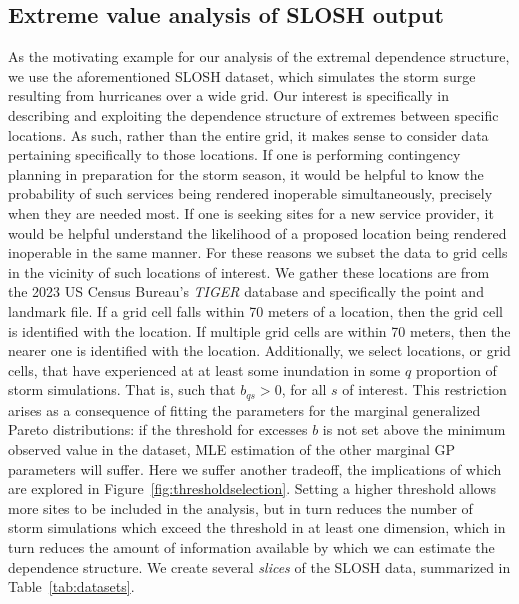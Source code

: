 \subsection{Extreme value analysis of SLOSH output\label{sec:slosh}}
As the motivating example for our analysis of the extremal dependence structure, we 
    use the aforementioned SLOSH dataset, which simulates the storm surge resulting 
    from hurricanes over a wide grid.  Our interest is specifically in describing 
    and exploiting the dependence structure of extremes between specific locations.  
    As such, rather than the entire grid, it makes sense to consider data pertaining
    specifically to those locations. If one is performing contingency planning in 
    preparation for the storm season, it would be helpful to know the probability of 
    such services being rendered 
    inoperable simultaneously, precisely when they are needed most.  If one is 
    seeking sites for a new service provider, it would be helpful understand the 
    likelihood of a proposed location being rendered inoperable in the same 
    manner.  For these reasons we subset the data to grid cells in the 
    vicinity of such locations of interest.  We gather these locations are from 
    the 2023 US Census Bureau's \emph{TIGER} database \needcite and specifically 
    the point and landmark file.  If a grid cell falls within 70 meters of a location,
    then the grid cell is identified with the location.  If multiple grid cells
    are within 70 meters, then the nearer one is identified with the location.
    Additionally, we select locations, or grid cells, that have experienced at
    at least some inundation in some $q$ proportion of storm simulations.  That is,
    such that $b_{qs} > 0$, for all $s$ of interest.  This restriction arises
    as a consequence of fitting the parameters for the marginal generalized Pareto
    distributions: if the threshold for excesses $b$ is not set above the minimum observed
    value in the dataset, MLE estimation of the other marginal GP parameters will suffer.
    Here we suffer another tradeoff, the implications of which are explored in 
    Figure~\ref{fig:thresholdselection}.  Setting a higher threshold allows more 
    sites to be included in the analysis, but in turn reduces the number of storm 
    simulations which exceed the threshold in at least one dimension, which in turn 
    reduces the amount of information available by which we can estimate the 
    dependence structure.  We create several \emph{slices} of the SLOSH data,
    summarized in Table~\ref{tab:datasets}.


